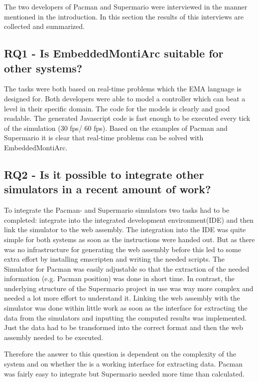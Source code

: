 The two developers of Pacman and Supermario were interviewed in the manner mentioned in the introduction. In this section the results of this interviews are collected and summarized.

\subsection{RQ1 - Is EmbeddedMontiArc suitable for other systems?}
The tasks were both based on real-time problems which the EMA language is designed for. Both developers were able to model a controller which can beat a level in their specific domain. The code for the models is clearly and good readable. The generated Javascript code is fast enough to be executed every tick of the simulation (30 fps/ 60 fps). Based on the examples of Pacman and Supermario it is clear that real-time problems can be solved with EmbeddedMontiArc.

\subsection{RQ2 - Is it possible to integrate other simulators in a recent amount of work?}
To integrate the Pacman- and Supermario simulators two tasks had to be completed: integrate into the integrated development environment(IDE) and then link the simulator to the web assembly. The integration into the IDE was quite simple for both systems as soon as the instructions were handed out. But as there was no infrastructure for generating the web assembly before this led to some extra effort by installing emscripten and writing the needed scripts. The Simulator for Pacman was easily adjustable so that the extraction of the needed information (e.g. Pacman position) was done in short time. In contrast, the underlying structure of the Supermario project in use was way more complex and needed a lot more effort to understand it. Linking the web assembly with the simulator was done within little work as soon as the interface for extracting the data from the simulators and inputting the computed results was implemented. Just the data had to be transformed into the correct format and then the web assembly needed to be executed.

Therefore the answer to this question is dependent on the complexity of the system and on whether the is a working interface for extracting data. Pacman was fairly easy to integrate but Supermario needed more time than calculated.


